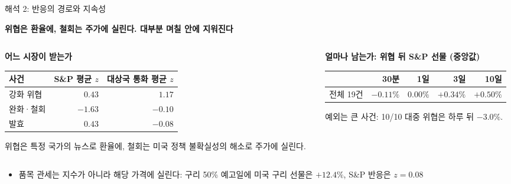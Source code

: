 \documentclass[aspectratio=169,9pt,t]{beamer}
\newcommand{\msg}[1]{{\fontsize{11.5}{15}\selectfont\bfseries\color{navy}\RaggedRight #1\par}\vspace{2.0mm}}
\newcommand{\lab}[1]{{\fontsize{8.4}{10.5}\selectfont\bfseries\color{crim}#1}}
\newcommand{\tf}{\fontsize{8.2}{10.4}\selectfont}
\begin{document}
\begin{frame}{해석 2: 반응의 경로와 지속성}
\msg{위협은 환율에, 철회는 주가에 실린다. 대부분 며칠 안에 지워진다}
\begin{columns}[t,onlytextwidth]
\begin{column}{0.47\textwidth}
\lab{어느 시장이 받는가}
\begingroup\tf
\begin{tabularx}{\linewidth}{@{}Yrr@{}}
\toprule
사건 & S\&P 평균 $z$ & 대상국 통화 평균 $z$\\
\midrule
강화 위협 & $0.43$ & $1.17$\\
완화·철회 & $-1.63$ & $-0.10$\\
발효 & $0.43$ & $-0.08$\\
\bottomrule
\end{tabularx}\endgroup
\vspace{1.5mm}
{\small\RaggedRight 위협은 특정 국가의 뉴스로 환율에, 철회는 미국 정책 불확실성의 해소로 주가에 실린다.\par}
\end{column}
\begin{column}{0.49\textwidth}
\lab{얼마나 남는가: 위협 뒤 S\&P 선물 (중앙값)}
\begingroup\tf
\begin{tabularx}{\linewidth}{@{}Yrrrr@{}}
\toprule
 & 30분 & 1일 & 3일 & 10일\\
\midrule
전체 19건 & $-0.11\%$ & $0.00\%$ & $+0.34\%$ & $+0.50\%$\\
\bottomrule
\end{tabularx}\endgroup
\vspace{1.5mm}
{\small\RaggedRight 예외는 큰 사건: 10/10 대중 위협은 하루 뒤 $-3.0\%$.\par}
\end{column}
\end{columns}
\vspace{1mm}
\begin{itemize}
\item 품목 관세는 지수가 아니라 해당 가격에 실린다: 구리 50\% 예고일에 미국 구리 선물은 $+12.4\%$, S\&P 반응은 $z=0.08$
\end{itemize}
\end{frame}
\end{document}
